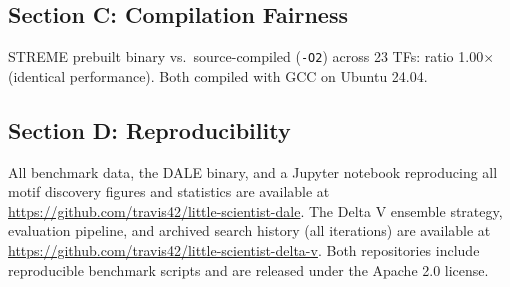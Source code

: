 \documentclass[11pt,a4paper]{article}
\begin{document}
\subsection*{Section C: Compilation Fairness}

STREME prebuilt binary vs.\ source-compiled (\texttt{-O2}) across 23 TFs: ratio 1.00$\times$ (identical performance). Both compiled with GCC on Ubuntu 24.04.

\subsection*{Section D: Reproducibility}

All benchmark data, the DALE binary, and a Jupyter notebook reproducing all motif discovery figures and statistics are available at \url{https://github.com/travis42/little-scientist-dale}. The Delta V ensemble strategy, evaluation pipeline, and archived search history (all iterations) are available at \url{https://github.com/travis42/little-scientist-delta-v}. Both repositories include reproducible benchmark scripts and are released under the Apache 2.0 license.
\end{document}

